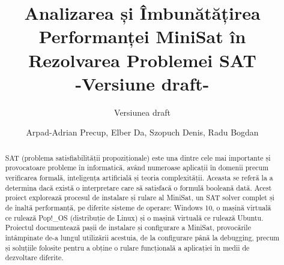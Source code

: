\documentclass{llncs}
\begin{document}
\title{Analizarea și Îmbunătățirea Performanței MiniSat în Rezolvarea Problemei SAT \\ -Versiune draft- }
\author{Versiunea draft}
\author{Arpad-Adrian Precup, Elber Da, Szopuch Denis, Radu Bogdan}

\maketitle



\begin{abstract}
SAT (problema satisfiabilității propoziționale) este una dintre cele mai importante și provocatoare probleme în informatică, având numeroase aplicații în domenii precum verificarea formală, inteligența artificială și teoria complexității. Aceasta se referă la a determina dacă există o interpretare care să satisfacă o formulă booleană dată. Acest proiect explorează procesul de instalare și rulare al MiniSat, un SAT solver complet și de înaltă performanță, pe diferite sisteme de operare: Windows 10, o mașină virtuală ce rulează Pop!\_OS (distribuție de Linux) și o mașină virtuală ce rulează Ubuntu.  Proiectul documentează pașii de instalare și configurare a MiniSat, provocările întâmpinate de-a lungul utilizării acestuia, de la configurare până la debugging, precum și soluțiile folosite pentru a obține o rulare funcțională a aplicației în medii de dezvoltare diferite.

\end{abstract}
\end{document}
